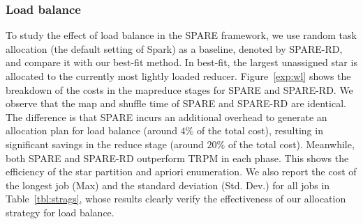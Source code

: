 \subsubsection{Load balance}
To study the effect of load balance in the SPARE framework, we use random task allocation (the default setting of Spark) as a baseline, denoted by SPARE-RD, and compare it with our best-fit method. In best-fit, the largest unassigned star is allocated to the currently most lightly loaded reducer.
Figure~\ref{exp:wl} shows the breakdown of the costs in the mapreduce stages 
for SPARE and SPARE-RD. %
We observe that the map and shuffle time of SPARE and SPARE-RD are identical. The difference is that SPARE incurs an additional overhead to generate an allocation plan for load balance (around $4\%$ of the total cost), resulting in significant savings in the reduce stage (around $20\%$ of the total cost). 
Meanwhile, both SPARE and SPARE-RD outperform TRPM in each phase. This shows the 
efficiency of the star partition and apriori enumeration.
We also report the cost of the longest job (Max) and the standard deviation (Std. Dev.)
for all jobs in Table~\ref{tbl:strags}, whose results clearly verify the effectiveness of our allocation strategy for load balance.
%

%

